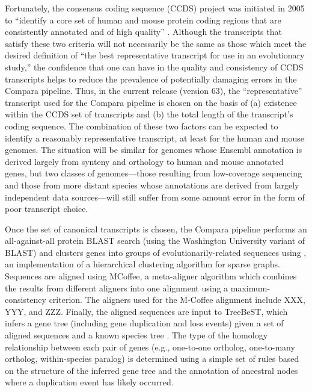 Fortunately, the consensus coding sequence (CCDS) project was
initiated in 2005 to ``identify a core set of human and mouse protein
coding regions that are consistently annotated and of high quality''
\citep{TODO, Pruitt et al. 2009 Gen Res}. Although the transcripts
that satisfy these two criteria will not necessarily be the same as
those which meet the desired definition of ``the best representative
transcript for use in an evolutionary study,'' the confidence that one
can have in the quality and consistency of CCDS transcripts helps to
reduce the prevalence of potentially damaging errors in the Compara
pipeline.  Thus, in the current release (version 63), the
``representative'' transcript used for the Compara pipeline is chosen
on the basis of (a) existence within the CCDS set of transcripts and
(b) the total length of the transcript's coding sequence. The
combination of these two factors can be expected to identify a
reasonably representative transcript, at least for the human and mouse
genomes. The situation will be similar for genomes whose Ensembl
annotation is derived largely from synteny and orthology to human and
mouse annotated genes, but two classes of genomes---those resulting
from low-coverage sequencing and those from more distant species whose
annotations are derived from largely independent data sources---will
still suffer from some amount error in the form of poor transcript
choice.

Once the set of canonical transcripts is chosen, the Compara pipeline
performs an all-against-all protein BLAST search (using the Washington
University variant of BLAST) and clusters genes into groups of
evolutionarily-related sequences using \hclust, an
implementation of a hierarchical clustering algorithm for sparse
graphs. Sequences are aligned using MCoffee, a meta-aligner algorithm
which combines the results from different aligners into one alignment
using a maximum-consistency criterion. The aligners used for the
M-Coffee alignment include XXX, YYY, and ZZZ. Finally, the aligned
sequences are input to TreeBeST, which infers a gene tree (including
gene duplication and loss events) given a set of aligned sequences and
a known species tree \citep{TODO}. The type of the homology
relationship between each pair of genes (e.g., one-to-one ortholog,
one-to-many ortholog, within-species paralog) is determined using a
simple set of rules based on the structure of the inferred gene tree
and the annotation of ancestral nodes where a duplication event has
likely occurred.

